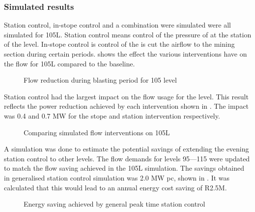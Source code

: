 	\subsubsection{Simulated results}
	Station control, in-stope control and a combination were simulated were all simulated for 105L. Station control means control of the pressure of at the station of the level. In-stope control is control of the is cut the airflow to the mining section during certain periods.  shows the effect the various interventions have on the flow for 105L compared to the baseline.

	\begin{figure}[h!]
		\centering
		
		\caption{Flow reduction during blasting period for 105 level}
		\label{fig: 105 Flow savings}
	\end{figure}
Station control had the largest impact on the flow usage for the level. This result reflects the power reduction achieved by each intervention shown in . The impact was 0.4 and 0.7 MW for the stope and station intervention respectively.
	
	\begin{figure}[h!]
		\centering
		
		\caption{Comparing simulated flow interventions on 105L}
		\label{fig: Station vs stope}
	\end{figure}
A simulation was done to estimate the potential savings of extending the evening station control to other levels.  The flow demands for levels 95---115 were updated to match the flow saving achieved in the 105L simulation. The savings obtained in generalised station control simulation was 2.0 MW \gls{pc}, shown in . It was calculated that this would lead to an annual energy cost saving of R2.5M.
\begin{figure}[h!]
	\centering
	
	\caption{Energy saving achieved by general peak time station control }
	\label{fig: General station optimise}
\end{figure}
